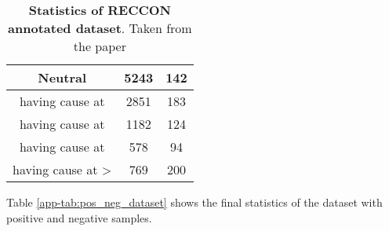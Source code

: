 \documentclass{article}
\begin{document}
\begin{table}[!h]
{\begin{tabular}{||c|c|c||}
Neutral & 5243               & 142                \\ \hline \hline
 having cause at   & 2851               & 183                \\ \hline
 having cause at  & 1182               & 124                \\ \hline
 having cause at  & 578                & 94                 \\ \hline
 having cause at  \textgreater{}  & 769                & 200                \\ \hline
\end{tabular}
}
\vspace{1mm}
\caption{\textbf{Statistics of RECCON annotated dataset}. Taken from the paper\cite{poria2020recognizing}}
\label{app-tab:datas}
\end{table}

Table \ref{app-tab:pos_neg_dataset} shows the final statistics of the dataset with positive and negative samples.
\end{document}
